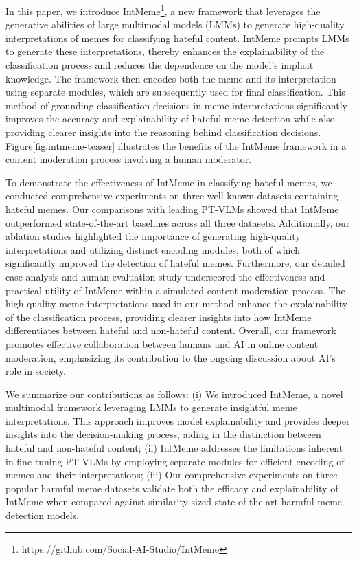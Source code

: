 In this paper, we introduce \textsf{IntMeme}\footnote{https://github.com/Social-AI-Studio/IntMeme}, a new framework that leverages the generative abilities of large multimodal models (LMMs) to generate high-quality interpretations of memes for classifying hateful content. \textsf{IntMeme} prompts LMMs to generate these interpretations, thereby enhances the explainability of the classification process and reduces the dependence on the model's implicit knowledge. The framework then encodes both the meme and its interpretation using separate modules, which are subsequently used for final classification. This method of grounding classification decisions in meme interpretations significantly improves the accuracy and explainability of hateful meme detection while also providing clearer insights into the reasoning behind classification decisions. Figure\ref{fig:intmeme-teaser} illustrates the benefits of the \textsf{IntMeme} framework in a content moderation process involving a human moderator.

To demonstrate the effectiveness of \textsf{IntMeme} in classifying hateful memes, we conducted comprehensive experiments on three well-known datasets containing hateful memes. Our comparisons with leading PT-VLMs showed that \textsf{IntMeme} outperformed state-of-the-art baselines across all three datasets. Additionally, our ablation studies highlighted the importance of generating high-quality interpretations and utilizing distinct encoding modules, both of which significantly improved the detection of hateful memes. Furthermore, our detailed case analysis and human evaluation study underscored the effectiveness and practical utility of \textsf{IntMeme} within a simulated content moderation process. The high-quality meme interpretations used in our method enhance the explainability of the classification process, providing clearer insights into how \textsf{IntMeme} differentiates between hateful and non-hateful content. Overall, our framework promotes effective collaboration between humans and AI in online content moderation, emphasizing its contribution to the ongoing discussion about AI's role in society.


We summarize our contributions as follows: (i) We introduced \textsf{IntMeme}, a novel multimodal framework leveraging LMMs to generate insightful meme interpretations. This approach improves model explainability and provides deeper insights into the decision-making process, aiding in the distinction between hateful and non-hateful content; (ii) \textsf{IntMeme} addresses the limitations inherent in fine-tuning PT-VLMs by employing separate modules for efficient encoding of memes and their interpretations; (iii) Our comprehensive experiments on three popular harmful meme datasets validate both the efficacy and explainability of \textsf{IntMeme} when compared against similarity sized state-of-the-art harmful meme detection models. %

